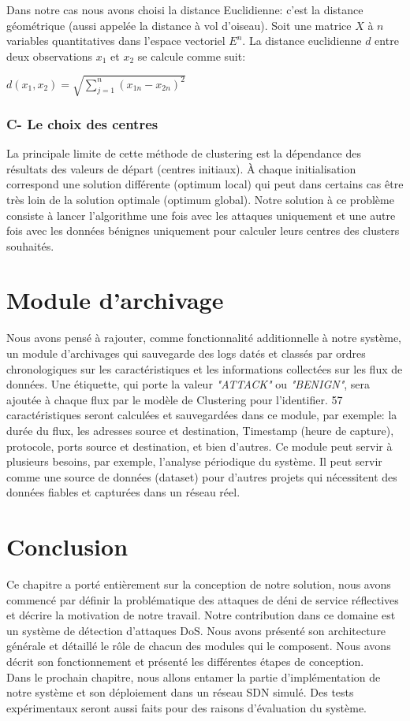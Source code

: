 \noindent Dans notre cas nous avons choisi la distance Euclidienne: c’est la distance géométrique (aussi appelée la distance à vol d’oiseau). Soit une matrice $X$ à $n$ variables quantitatives dans l’espace vectoriel $E^{n}$. La distance euclidienne $d$ entre deux observations $x_{1}$ et $x_{2}$ se calcule comme suit:

\begin{large}
		\begin{center}
			$ d(x_{1}, x_{2}) = \sqrt{\sum_{j=1}^{n}(x_{1n} - x_{2n})^{2}}$
		\end{center}
	\end{large}

\subsubsection{C- Le choix des centres}
La principale limite de cette méthode de clustering est la dépendance des résultats des valeurs de départ (centres initiaux). À chaque initialisation correspond une solution différente (optimum local) qui peut dans certains cas être très loin de la solution optimale (optimum global). Notre solution à ce problème consiste à lancer l'algorithme une fois avec les attaques uniquement et une autre fois avec les données bénignes uniquement pour calculer leurs centres des clusters souhaités.

\section{Module d'archivage}
Nous avons pensé à rajouter, comme fonctionnalité additionnelle à notre système, un module d’archivages qui sauvegarde des logs datés et classés par ordres chronologiques sur les caractéristiques et les informations collectées sur les flux de données.  Une étiquette, qui porte la valeur \textit{"ATTACK"} ou \textit{"BENIGN"}, sera ajoutée à chaque flux par le modèle de Clustering pour l'identifier. 57 caractéristiques seront calculées et sauvegardées dans ce module, par exemple: la durée du flux, les adresses source et destination, Timestamp (heure de capture), protocole, ports source et destination, et bien d'autres. Ce module peut servir à plusieurs besoins, par exemple, l'analyse périodique du système. Il peut servir comme une source de données (dataset) pour d'autres projets qui nécessitent des données fiables et capturées dans un réseau réel. 

\section{Conclusion}
Ce chapitre a porté entièrement sur la conception de notre solution, nous avons commencé par définir la problématique des attaques de déni de service réflectives et décrire la motivation de notre travail. Notre contribution dans ce domaine est un système de détection d'attaques DoS. Nous avons présenté son architecture générale et détaillé le rôle de chacun des modules qui le composent. Nous avons décrit son fonctionnement et présenté les différentes étapes de conception.\\

\noindent Dans le prochain chapitre, nous allons entamer la partie d'implémentation de notre système et son déploiement dans un réseau SDN simulé. Des tests expérimentaux seront aussi faits pour des raisons d'évaluation du système.
